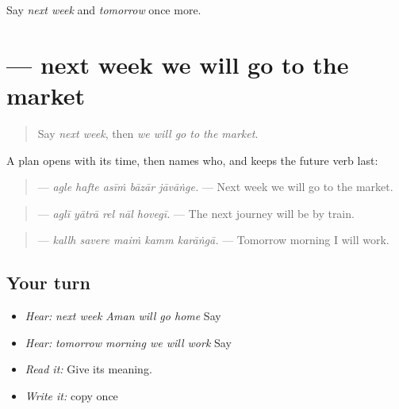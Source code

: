 \begin{tcolorbox}[breakable,colback=teal!4,colframe=teal!35!black,title={Before you move on}]
Say \emph{next week} and \emph{tomorrow} once more.
\end{tcolorbox}
\section[\texorpdfstring{\pa{ਅਗਲੇ} \pa{ਹਫ਼ਤੇ} \pa{ਅਸੀਂ} … (agle hafte asīṁ …)}{ਅਗਲੇ ਹਫ਼ਤੇ ਅਸੀਂ … (agle hafte asīṁ …)}]{     — next week we will go to the market}

\label{lesson:PA-C223-next-week}



\begin{quote}
Say \emph{next week}, then \emph{we will go to the market}.
\end{quote}

\begin{grammarlens}[title={Grammar Lens: when, then who, then the future}]
A plan opens with its time, then names who, and keeps the future verb last:

\begin{quote}
\textbf{    } — \emph{agle hafte asīṁ bāzār jāvāṅge.} — Next week we will go to the market.
\end{quote}

\begin{quote}
\textbf{    } — \emph{aglī yātrā rel nāl hovegī.} — The next journey will be by train.
\end{quote}

\begin{quote}
\textbf{    } — \emph{kallh savere maiṁ kamm karāṅgā.} — Tomorrow morning I will work.
\end{quote}
\end{grammarlens}

\subsection*{Your turn}
\begin{itemize}
\raggedright
  \item \emph{Hear:} \emph{next week Aman will go home} Say \textbf{    }
  \item \emph{Hear:} \emph{tomorrow morning we will work} Say \textbf{    }
  \item \emph{Read it:} \textbf{    } Give its meaning.
  \item \emph{Write it:} copy \textbf{    } once
\end{itemize}

